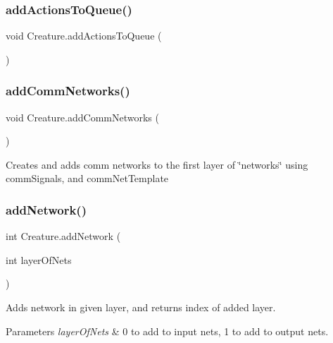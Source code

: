 \subsubsection{\texorpdfstring{add\+Actions\+To\+Queue()}{addActionsToQueue()}}
{\footnotesize\ttfamily void Creature.\+add\+Actions\+To\+Queue (\begin{DoxyParamCaption}{ }\end{DoxyParamCaption})}

\mbox{\label{class_creature_a617588216838f0fe3f8861f38c2746f2}} 
\subsubsection{\texorpdfstring{add\+Comm\+Networks()}{addCommNetworks()}}
{\footnotesize\ttfamily void Creature.\+add\+Comm\+Networks (\begin{DoxyParamCaption}{ }\end{DoxyParamCaption})}



Creates and adds comm networks to the first layer of \char`\"{}networks\char`\"{} using comm\+Signals, and comm\+Net\+Template 

\mbox{\label{class_creature_aafecd84cf3b44bcb8dd67cd9518e3326}} 
\subsubsection{\texorpdfstring{add\+Network()}{addNetwork()}}
{\footnotesize\ttfamily int Creature.\+add\+Network (\begin{DoxyParamCaption}\item[{int}]{layer\+Of\+Nets }\end{DoxyParamCaption})}



Adds network in given layer, and returns index of added layer. 


\begin{DoxyParams}{Parameters}
{\em layer\+Of\+Nets} & 0 to add to input nets, 1 to add to output nets.\\
\hline
\end{DoxyParams}
\mbox{\label{class_creature_a31a49fbd361a70ff3f1f41886519d0c5}} 

